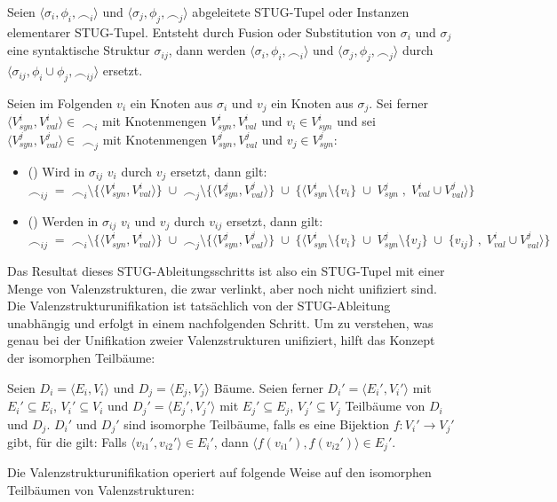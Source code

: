 \begin{definition}
Seien $\langle \sigma_i, \phi_i, \frown_i \rangle$ und $\langle \sigma_j, \phi_j, \frown_j \rangle$ abgeleitete STUG-Tupel oder Instanzen elementarer STUG-Tupel. Entsteht durch Fusion oder Substitution von $\sigma_i$ und $\sigma_j$ eine syntaktische Struktur $\sigma_{ij}$, dann werden $\langle \sigma_i, \phi_i, \frown_i \rangle$ und $\langle \sigma_j, \phi_j, \frown_j \rangle$ durch $\langle \sigma_{ij}, \phi_i \cup \phi_j, \frown_{ij} \rangle$ ersetzt. 

Seien im Folgenden $v_i$ ein Knoten aus $\sigma_i$ und $v_j$ ein Knoten aus $\sigma_j$. Sei ferner $\langle V_{syn}^i, V_{val}^i \rangle \in \; \frown_i$ mit Knotenmengen $V_{syn}^i, V_{val}^i$ und $v_i \in V_{syn}^i$ und sei $\langle V_{syn}^j, V_{val}^j \rangle \in \; \frown_j$ mit Knotenmengen $V_{syn}^j, V_{val}^j$ und $v_j \in V_{syn}^j$:

\begin{itemize}
\item () Wird in $\sigma_{ij}$ $v_i$ durch $v_j$ ersetzt, dann gilt: \\
$\frown_{ij} \; = \; \frown_i \setminus \{\langle V_{syn}^i, V_{val}^i \rangle\} \; \cup \;\frown_j \setminus \{\langle V_{syn}^j, V_{val}^j \rangle\} \; \cup \; \{\langle V_{syn}^i \setminus \{v_i\} \; \cup \; V_{syn}^j \; , \; V_{val}^i \cup V_{val}^j \rangle\}$
\item () Werden in $\sigma_{ij}$ $v_i$ und $v_j$ durch $v_{ij}$ ersetzt, dann gilt: \\
$\frown_{ij} \; = \; \frown_i \setminus \{\langle V_{syn}^i, V_{val}^i \rangle\} \; \cup \; \frown_j \setminus \{\langle V_{syn}^j, V_{val}^j \rangle\} \; \cup \; \{\langle V_{syn}^i \setminus \{v_i\} \; \cup \; V_{syn}^j \setminus \{v_j\} \; \cup \; \{v_{ij}\} \; , \; V_{val}^i \cup V_{val}^j \rangle\}$
\end{itemize} 

\end{definition}   
Das Resultat dieses STUG-Ableitungsschritts ist also ein STUG-Tupel mit einer Menge von Valenzstrukturen, die zwar verlinkt, aber noch nicht unifiziert sind. Die Valenzstrukturunifikation ist tatsächlich von der STUG-Ableitung unabhängig und erfolgt in einem nachfolgenden Schritt. Um zu verstehen, was genau bei der Unifikation zweier Valenzstrukturen unifiziert, hilft das Konzept der isomorphen Teilbäume:  

\begin{definition}
Seien $D_i = \langle E_i,V_i \rangle$ und $D_j = \langle E_j,V_j \rangle$ Bäume.
Seien ferner $D_i' = \langle E_i', V_i' \rangle$ mit $E_i' \subseteq E_i$, $V_i' \subseteq V_i$ und $D_j' = \langle E_j', V_j' \rangle$ mit $E_j' \subseteq E_j$, $V_j' \subseteq V_j$ Teilbäume von $D_i$ und $D_j$. $D_i'$ und $D_j'$ sind isomorphe Teilbäume, falls es eine Bijektion $f:V_i' \to V_j'$ gibt, für die gilt: Falls $\langle v_{i1}', v_{i2}' \rangle \in E_i'$, dann $\langle f(v_{i1}'), f(v_{i2}') \rangle \in E_j'$.
\end{definition}
Die Valenzstrukturunifikation operiert auf folgende Weise auf den isomorphen Teilbäumen von Valenzstrukturen:

